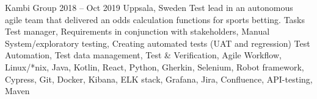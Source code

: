 \documentclass{sobCV}[2015/09/08]
\begin{document}
   

   {Kambi Group}
   {2018 -- Oct 2019}
   {Uppsala, Sweden}{
       Test lead in an autonomous agile team that delivered an odds calculation
       functions for sports betting.
   }
    {Tasks}{
       Test manager,
       Requirements in conjunction with stakeholders,
       Manual System/exploratory testing,
       Creating automated tests (UAT and regression)
 }{  %
 }{
       Test Automation,
       Test data management,
       Test \& Verification,
       Agile Workflow, 
       Linux/*nix, 
       Java, 
       Kotlin, 
       React, 
       Python, 
       Gherkin, 
       Selenium, 
       Robot framework,
       Cypress, 
       Git, 
       Docker, 
       Kibana, 
       ELK stack, 
       Grafana, 
       Jira, 
       Confluence, 
       API-testing, 
       Maven 
}
\end{document}
